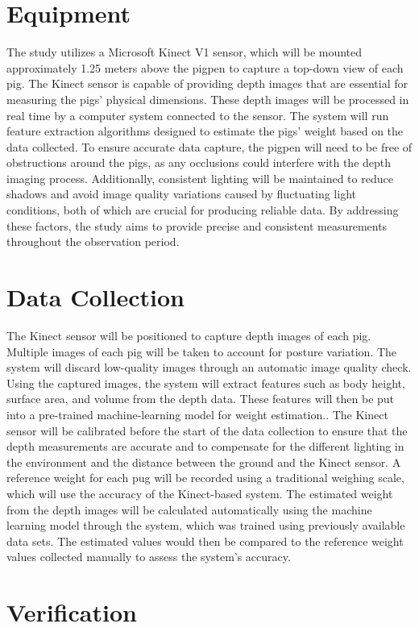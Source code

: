 {\section{Equipment}
The study utilizes a Microsoft Kinect V1 sensor, which will be mounted approximately 1.25 meters above the pigpen to capture a top-down view of each pig. The Kinect sensor is capable of providing depth images that are essential for measuring the pigs' physical dimensions. These depth images will be processed in real time by a computer system connected to the sensor. The system will run feature extraction algorithms designed to estimate the pigs' weight based on the data collected. To ensure accurate data capture, the pigpen will need to be free of obstructions around the pigs, as any occlusions could interfere with the depth imaging process. Additionally, consistent lighting will be maintained to reduce shadows and avoid image quality variations caused by fluctuating light conditions, both of which are crucial for producing reliable data. By addressing these factors, the study aims to provide precise and consistent measurements throughout the observation period.

\section{Data Collection}
The Kinect sensor will be positioned to capture depth images of each pig. Multiple images of each pig will be taken to account for posture variation. The system will discard low-quality images through an automatic image quality check. Using the captured images, the system will extract features such as body height, surface area, and volume from the depth data. These features will then be put into a pre-trained machine-learning model for weight estimation.. 
The Kinect sensor will be calibrated before the start of the data collection to ensure that the depth measurements are accurate and to compensate for the different lighting in the environment and the distance between the ground and the Kinect sensor. A reference weight for each pug will be recorded using a traditional weighing scale, which will use the accuracy of the Kinect-based system. The estimated weight from the depth images will be calculated automatically using the machine learning model through the system, which was trained using previously available data sets. The estimated values would then be compared to the reference weight values collected manually to assess the system's accuracy.

\section{Verification}

}
